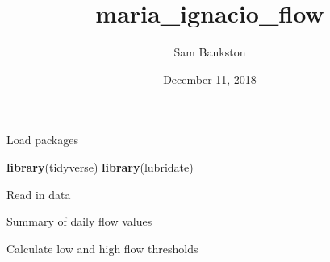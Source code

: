 \documentclass[]{article}
\title{maria\_ignacio\_flow}
\author{Sam Bankston}
\date{December 11, 2018}
\newenvironment{Shaded}{\begin{snugshade}}{\end{snugshade}}
\newcommand{\KeywordTok}[1]{\textcolor[rgb]{0.13,0.29,0.53}{\textbf{{#1}}}}
\newcommand{\DataTypeTok}[1]{\textcolor[rgb]{0.13,0.29,0.53}{{#1}}}
\newcommand{\DecValTok}[1]{\textcolor[rgb]{0.00,0.00,0.81}{{#1}}}
\newcommand{\StringTok}[1]{\textcolor[rgb]{0.31,0.60,0.02}{{#1}}}
\newcommand{\OtherTok}[1]{\textcolor[rgb]{0.56,0.35,0.01}{{#1}}}
\newcommand{\NormalTok}[1]{{#1}}
\begin{document}
\maketitle

Load packages

\begin{Shaded}
\begin{Highlighting}[]
\KeywordTok{library}\NormalTok{(tidyverse)}
\KeywordTok{library}\NormalTok{(lubridate)}
\end{Highlighting}
\end{Shaded}

Read in data

\begin{Shaded}
\end{Shaded}

Summary of daily flow values

\begin{Shaded}
\end{Shaded}

Calculate low and high flow thresholds
\end{document}
